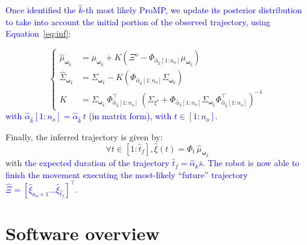 \documentclass[utf8]{frontiersSCNS} %
\newcommand{\rev}[1]{\textcolor{blue}{#1}}
\begin{document}

\rev{Once identified the $\hat{k}$-th  most likely ProMP, we update its posterior distribution to take into account the initial portion of the observed trajectory, using Equation~\ref{eq:inf}:}


\begin{equation} \label{eq:udateWithAlpha}
\left\{
\begin{array}{rl}
\hat{\mu}_{\boldsymbol{\omega}_{\hat{k}}} &= \mu_{\boldsymbol{\omega}_{\hat{k}}}  + K(\Xi^o - \Phi_{\hat{\alpha}_{\hat{k}}[1:{n_o}]}\mu_{\boldsymbol{\omega}_{\hat{k}}} ) \\ 
\hat{\Sigma}_{\boldsymbol{\omega}_{\hat{k}}}  &= \Sigma_{\boldsymbol{\omega}_{\hat{k}}}  - K(\Phi_{\hat{\alpha}_{\hat{k}}[1:{n_o}]} \Sigma_{\boldsymbol{\omega}_{\hat{k}}} ) \\
K&= \Sigma_{\boldsymbol{\omega}_{\hat{k}}} \, \Phi_{\hat{\alpha}_{\hat{k}}[1:{n_o}]}^\top \, (\Sigma_{\xi^o} + \Phi_{\hat{\alpha}_{\hat{k}}[1:n_o]}\Sigma_{\boldsymbol{\omega}_{\hat{k}}}  \Phi_{\hat{\alpha}_{\hat{k}}[1:n_o]}^\top)^{-1}
\end{array}
\right.\end{equation}
\rev{with $\hat{\alpha}_{\hat{k}}[1:n_o] = \hat{\alpha}_{\hat{k}} \, t$ (in matrix form), with $t \in [1:n_o]$.}

Finally, the inferred trajectory is given by: 
$$\forall t \in [1:\hat{t}_f], \hat{\xi}(t) = \Phi_t \, \hat{\mu}_{\boldsymbol{\omega}_{\hat{k}}}$$
with \rev{the expected duration of the trajectory $\hat{t}_f = \hat{\alpha}_k\bar{s}$.
The robot is now able to finish the movement executing the \rev{most-likely} ``future'' trajectory $\hat{\Xi} =[\hat{\xi}_{n_o+1} \ldots \hat{\xi}_{\hat{t_{f}}}]^\top$.
}

\section{Software overview}\label{sec:softwareOverview}
\end{document}
